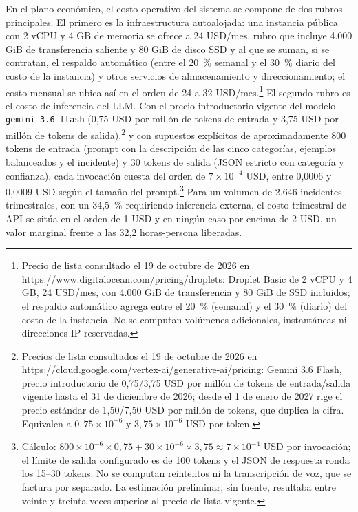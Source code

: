 En el plano económico, el costo operativo del sistema se compone de dos rubros principales. El primero es la infraestructura autoalojada: una instancia pública con 2 vCPU y 4 GB de memoria se ofrece a 24 USD/mes, rubro que incluye 4.000 GiB de transferencia saliente y 80 GiB de disco SSD y al que se suman, si se contratan, el respaldo automático (entre el 20~\% semanal y el 30~\% diario del costo de la instancia) y otros servicios de almacenamiento y direccionamiento; el costo mensual se ubica así en el orden de 24 a 32 USD/mes.\footnote{Precio de lista consultado el 19 de octubre de 2026 en \url{https://www.digitalocean.com/pricing/droplets}: Droplet Basic de 2 vCPU y 4 GB, 24 USD/mes, con 4.000 GiB de transferencia y 80 GiB de SSD incluidos; el respaldo automático agrega entre el 20~\% (semanal) y el 30~\% (diario) del costo de la instancia. No se computan volúmenes adicionales, instantáneas ni direcciones IP reservadas.} El segundo rubro es el costo de inferencia del LLM. Con el precio introductorio vigente del modelo \texttt{gemini-3.6-flash} (0,75 USD por millón de tokens de entrada y 3,75 USD por millón de tokens de salida),\footnote{Precios de lista consultados el 19 de octubre de 2026 en \url{https://cloud.google.com/vertex-ai/generative-ai/pricing}: Gemini 3.6 Flash, precio introductorio de 0,75/3,75 USD por millón de tokens de entrada/salida vigente hasta el 31 de diciembre de 2026; desde el 1 de enero de 2027 rige el precio estándar de 1,50/7,50 USD por millón de tokens, que duplica la cifra. Equivalen a \(0{,}75\times10^{-6}\) y \(3{,}75\times10^{-6}\) USD por token.} y con supuestos explícitos de aproximadamente 800 tokens de entrada (prompt con la descripción de las cinco categorías, ejemplos balanceados y el incidente) y 30 tokens de salida (JSON estricto con categoría y confianza), cada invocación cuesta del orden de \(7\times10^{-4}\) USD, entre 0,0006 y 0,0009 USD según el tamaño del prompt.\footnote{Cálculo: \(800\times10^{-6}\times0{,}75 + 30\times10^{-6}\times3{,}75 \approx 7\times10^{-4}\) USD por invocación; el límite de salida configurado es de 100 tokens y el JSON de respuesta ronda los 15--30 tokens. No se computan reintentos ni la transcripción de voz, que se factura por separado. La estimación preliminar, sin fuente, resultaba entre veinte y treinta veces superior al precio de lista vigente.} Para un volumen de 2.646 incidentes trimestrales, con un 34,5~\% requiriendo inferencia externa, el costo trimestral de API se sitúa en el orden de 1 USD y en ningún caso por encima de 2 USD, un valor marginal frente a las 32,2 horas-persona liberadas.

